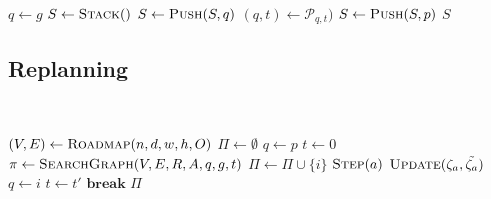 \begin{algorithm}[ht]
    \caption{$\Function{BacktrackPath}(p, g, \mathcal{P})$}
    \label{algo:backtrack}
    \begin{algorithmic}[1]
        \setcounter{ALC@line}{0}
        \vspace*{1mm}
        \STATE $q \leftarrow g$
        \STATE $S \leftarrow \Function{Stack}()$
            \STATE $S \leftarrow \Function{Push}(S, q)$
            \STATE $(q, t) \leftarrow \mathcal{P}_{q, t})$
        \ENDWHILE
        \STATE $S \leftarrow \Function{Push}(S, p)$
        \RETURN $S$
    \end{algorithmic}
\end{algorithm}

\subsection{Replanning}

\begin{algorithm}[ht]
    \caption{$\Function{GetPath}(n, d, w, h, \delta, p, g, O, A, R)$}
    \\\algorithmicensure{}
    \label{algo:path}
    \begin{algorithmic}[1]
        \setcounter{ALC@line}{0}
        \STATE $(V, E) \leftarrow \Function{Roadmap}(n, d, w, h, O)$
        \STATE $\Pi \leftarrow \emptyset$
        \STATE $q \leftarrow p$
        \STATE $t \leftarrow 0$
            \STATE $\pi \leftarrow \Function{SearchGraph}(V, E, R, A, q, g, t)$
                \STATE $\Pi \leftarrow \Pi \cup \{i\}$
                    \STATE $\Function{Step}(a)$
                \ENDFOR
                        \STATE $\Function{Update}(\zeta_a, \tilde{\zeta_a})$
                    \ENDFOR
                    \STATE $q \leftarrow i$
                    \STATE $t \leftarrow t'$
                    \STATE $\textbf{break}$
                \ENDIF
            \ENDFOR
        \ENDWHILE
        \RETURN $\Pi$
    \end{algorithmic}
\end{algorithm}




